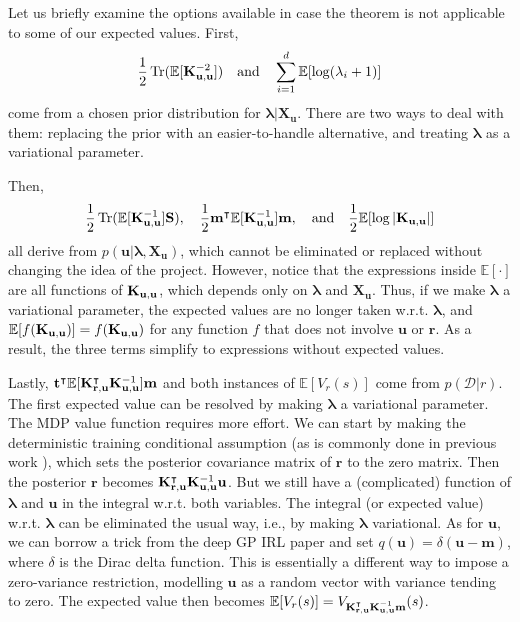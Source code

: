 \documentclass{mprop}
\theoremstyle{definition}
\DeclareMathOperator{\Tr}{Tr}
\begin{document}
Let us briefly examine the options available in case the theorem is not
applicable to some of our expected values. First,
\[ \frac{1}{2}\Tr(\mathbb{E}[\Kuu^{-2}]) \quad \text{and} \quad \sum_{i=1}^d
  \mathbb{E}[\log(\lambda_i + 1)] \]
come from a chosen prior distribution for $\bm\lambda | \mathbf{X_u}$.
There are two ways to deal with them: replacing the prior with an
easier-to-handle alternative, and treating $\bm\lambda$ as a variational
parameter.

Then,
\[ \frac{1}{2}\Tr(\mathbb{E}[\Kuu^{-1}]\mathbf{S}), \quad 
  \frac{1}{2}\mathbf{m}^\intercal\mathbb{E}[\Kuu^{-1}]\mathbf{m}, \quad
  \text{and} \quad \frac{1}{2}\mathbb{E}[\log|\Kuu|] \]
all derive from $p(\mathbf{u} | \bm\lambda, \mathbf{X_u})$, which cannot be
eliminated or replaced without changing the idea of the project. However, notice
that the expressions inside $\mathbb{E}[\cdot]$ are all functions of $\mathbf{K}_{\mathbf{u},\mathbf{u}}$,
which depends only on $\bm\lambda$ and $\mathbf{X_u}$. Thus, if we make
$\bm\lambda$ a variational parameter, the expected values are no longer taken
w.r.t. $\bm\lambda$, and $\mathbb{E}[f(\mathbf{K}_{\mathbf{u},\mathbf{u}})] = f(\mathbf{K}_{\mathbf{u},\mathbf{u}})$ for any function $f$
that does not involve $\mathbf{u}$ or $\mathbf{r}$. As a result, the three
terms simplify to expressions without expected values.

Lastly,
$\mathbf{t}^\intercal\mathbb{E}[\mathbf{K}_{\mathbf{r},\mathbf{u}}^\intercal\mathbf{K}_{\mathbf{u},\mathbf{u}}^{-1}]\mathbf{m}$ and both
instances of $\mathbb{E}[V_r(s)]$ come from $p(\mathcal{D} | r)$. The first
expected value can be resolved by making $\bm\lambda$ a variational
parameter. The MDP value function requires more effort. We can start by making
the deterministic training conditional assumption (as is commonly done in
previous work \cite{DBLP:conf/uai/JinDAS17,DBLP:conf/nips/LevinePK11}), which
sets the posterior covariance matrix of $\mathbf{r}$ to the zero matrix. Then
the posterior $\mathbf{r}$ becomes $\mathbf{K}_{\mathbf{r},\mathbf{u}}^\intercal\mathbf{K}_{\mathbf{u},\mathbf{u}}^{-1}\mathbf{u}$. But we
still have a (complicated) function of $\bm\lambda$ and $\mathbf{u}$ in the
integral w.r.t. both variables. The integral (or expected value) w.r.t.
$\bm\lambda$ can be eliminated the usual way, i.e., by making $\bm\lambda$
variational. As for $\mathbf{u}$, we can borrow a trick from the deep GP IRL
paper \cite{DBLP:conf/uai/JinDAS17} and set $q(\mathbf{u}) = \delta(\mathbf{u} -
\mathbf{m})$, where $\delta$ is the Dirac delta function. This is essentially a
different way to impose a zero-variance restriction, modelling $\mathbf{u}$ as a
random vector with variance tending to zero. The expected value then becomes
$\mathbb{E}[V_r(s)] = V_{\mathbf{K}_{\mathbf{r},\mathbf{u}}^\intercal\mathbf{K}_{\mathbf{u},\mathbf{u}}^{-1}\mathbf{m}}(s)$.
\end{document}
